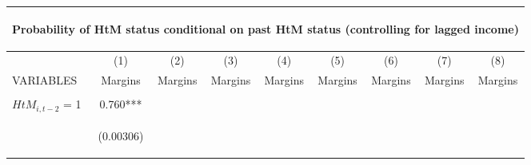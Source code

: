 \begin{center}
\begin{tabular}{lcccccccc}
\multicolumn{9}{c}{\begin{large}Probability of HtM status conditional on past HtM status (controlling for lagged income) \end{large}} \\ \hline
 & (1) & (2) & (3) & (4) & (5) & (6) & (7) & (8) \\
VARIABLES & Margins & Margins & Margins & Margins & Margins & Margins & Margins & Margins \\ \hline
\vspace{4pt} & \begin{footnotesize}\end{footnotesize} & \begin{footnotesize}\end{footnotesize} & \begin{footnotesize}\end{footnotesize} & \begin{footnotesize}\end{footnotesize} & \begin{footnotesize}\end{footnotesize} & \begin{footnotesize}\end{footnotesize} & \begin{footnotesize}\end{footnotesize} & \begin{footnotesize}\end{footnotesize} \\
$ {HtM}_{i, t-2} $ = 1 & 0.760*** &  &  &  &  &  &  &  \\
\vspace{4pt} & \begin{footnotesize}(0.00306)\end{footnotesize} & \begin{footnotesize}\end{footnotesize} & \begin{footnotesize}\end{footnotesize} & \begin{footnotesize}\end{footnotesize} & \begin{footnotesize}\end{footnotesize} & \begin{footnotesize}\end{footnotesize} & \begin{footnotesize}\end{footnotesize} & \begin{footnotesize}\end{footnotesize} \\

\end{tabular}
\end{center}

